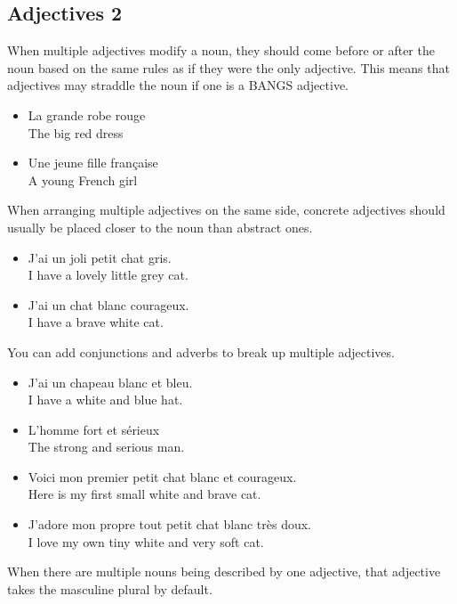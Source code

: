 \pagebreak
\subsection{Adjectives 2}

When multiple adjectives modify a noun, they should come before or after the noun based on the same rules as if they were the only adjective. This means that adjectives may straddle the noun if one is a BANGS adjective.

\begin{itemize}
  \item  La grande robe rouge \\ The big red dress
  \item  Une jeune fille fran{\c c}aise \\ A young French girl
\end{itemize}

When arranging multiple adjectives on the same side, concrete adjectives should usually be placed closer to the noun than abstract ones.

\begin{itemize}
  \item  J'ai un joli petit chat gris. \\ I have a lovely little grey cat.
  \item  J'ai un chat blanc courageux. \\ I have a brave white cat.
\end{itemize}

You can add conjunctions and adverbs to break up multiple adjectives.

\begin{itemize}
  \item  J'ai un chapeau blanc et bleu. \\ I have a white and blue hat.
  \item  L'homme fort et s{\'e}rieux \\ The strong and serious man.
  \item  Voici mon premier petit chat blanc et courageux. \\ Here is my first small white and brave cat.
  \item  J'adore mon propre tout petit chat blanc tr{\`e}s doux. \\ I love my own tiny white and very soft cat.
\end{itemize}

When there are multiple nouns being described by one adjective, that adjective takes the masculine plural by default.

